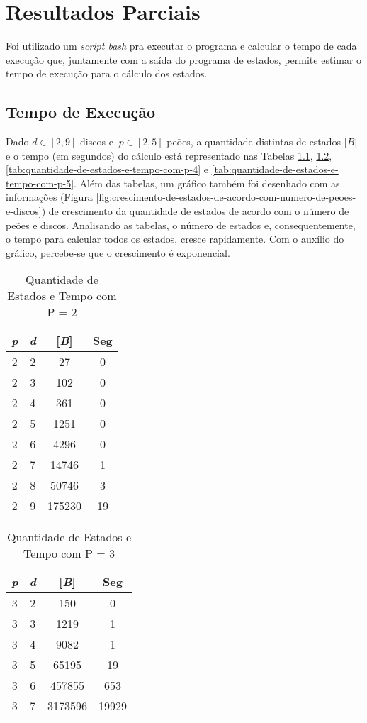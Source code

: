 \chapter[Resultados Parciais]{Resultados Parciais}
\label{cha:resultados-parciais}

Foi utilizado um \emph{script bash} pra executar o programa e calcular o tempo de cada execução que, juntamente com a saída do programa de estados, permite estimar o tempo de execução para o cálculo dos estados.

\section{Tempo de Execução}

Dado $d\!\in\![2,9]$ discos e $\ p\!\in\![2,5]$ peões, a quantidade distintas de estados [$B$] e o tempo (em segundos) do cálculo está representado nas Tabelas \ref{tab:quantidade-de-estados-e-tempo-com-p-2}, \ref{tab:quantidade-de-estados-e-tempo-com-p-3}, \ref{tab:quantidade-de-estados-e-tempo-com-p-4} e \ref{tab:quantidade-de-estados-e-tempo-com-p-5}. Além das tabelas, um gráfico também foi desenhado com as informações (Figura \ref{fig:crescimento-de-estados-de-acordo-com-numero-de-peoes-e-discos}) de crescimento da quantidade de estados de acordo com o número de peões e discos. Analisando as tabelas, o número de estados e, consequentemente, o tempo para calcular todos os estados, cresce rapidamente. Com o auxílio do gráfico, percebe-se que o crescimento é exponencial.

\begin{table}[ht]
\centering
\begin{tabular}{|c|c|c|c|}
\hline
\emph{p} & \emph{d} & [\emph{B}] & Seg\tabularnewline
\hline
\hline
2 & 2 & 27 & 0\tabularnewline
\hline
2 & 3 & 102 & 0\tabularnewline
\hline
2 & 4 & 361 & 0\tabularnewline
\hline
2 & 5 & 1251 & 0\tabularnewline
\hline
2 & 6 & 4296 & 0\tabularnewline
\hline
2 & 7 & 14746 & 1\tabularnewline
\hline
2 & 8 & 50746 & 3\tabularnewline
\hline
2 & 9 & 175230 & 19\tabularnewline
\hline
\end{tabular}
\caption{Quantidade de Estados e Tempo com P = 2}
\label{tab:quantidade-de-estados-e-tempo-com-p-2}
\end{table}

\begin{table}[ht]
\centering
\begin{tabular}{|c|c|c|c|}
\hline
\emph{p} & \emph{d} & [\emph{B}] & Seg\tabularnewline
\hline
\hline
3 & 2 & 150 & 0\tabularnewline
\hline
3 & 3 & 1219 & 1\tabularnewline
\hline
3 & 4 & 9082 & 1\tabularnewline
\hline
3 & 5 & 65195 & 19\tabularnewline
\hline
3 & 6 & 457855 & 653\tabularnewline
\hline
3 & 7 & 3173596 & 19929\tabularnewline
\hline
\end{tabular}
\caption{Quantidade de Estados e Tempo com P = 3}
\label{tab:quantidade-de-estados-e-tempo-com-p-3}
\end{table}

